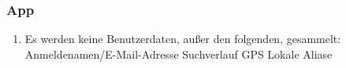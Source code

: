 \subsubsection{App}

\begin{enumerate}
    \item Es werden keine Benutzerdaten, außer den folgenden, gesammelt:
        \subitem Anmeldenamen/E-Mail-Adresse
        \subitem Suchverlauf
        \subitem GPS
        \subitem Lokale Aliase
\end{enumerate}